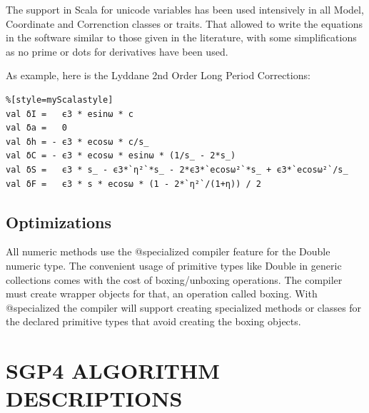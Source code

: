 \documentclass{article}
\begin{document}
The support in Scala for unicode variables has been used intensively in all Model,
Coordinate and Correnction classes or traits. That allowed to write
the equations in the software similar to those given in the literature, with some
simplifications as no prime or dots for derivatives have been used.



As example, here is the Lyddane 2nd Order Long Period Corrections:
\begin{lstlisting}%[style=myScalastyle]
val δI =   ϵ3 * esinω * c
val δa =   0
val δh = - ϵ3 * ecosω * c/s_
val δC = - ϵ3 * ecosω * esinω * (1/s_ - 2*s_)
val δS =   ϵ3 * s_ - ϵ3*`η²`*s_ - 2*ϵ3*`ecosω²`*s_ + ϵ3*`ecosω²`/s_
val δF =   ϵ3 * s * ecosω * (1 - 2*`η²`/(1+η)) / 2
\end{lstlisting}

\subsection{Optimizations}
\label{sec:optimizations}

All numeric methods use the @specialized compiler feature for the Double numeric type.
The convenient usage of primitive types like Double in generic collections comes with
the cost of boxing/unboxing operations. The compiler
must create wrapper objects for that, an operation called boxing. With @specialized
the compiler will support creating specialized methods or classes for the
declared primitive types that avoid creating the boxing objects.




\section{SGP4 ALGORITHM DESCRIPTIONS}
\label{sec:algorithms}
\end{document}
